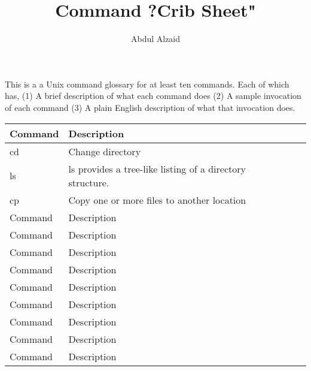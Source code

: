\documentclass[12pt, oneside]{article}   	%
\title{Command ?Crib Sheet"}
\author{Abdul Alzaid}
\begin{document}
\maketitle
This is a a Unix command glossary for at least ten commands. Each of which has, (1) A brief description of what each command does (2) A sample invocation of each command (3) A plain English description of what that invocation does.


\begin{center}
    \begin{tabular}{| l | l | l | l |}
    \hline
    Command & Description  \\ \hline
    cd & Change directory  \\ \hline
    ls &  ls provides a tree-like listing of a directory structure.  \\ \hline
    cp & Copy one or more files to another location  \\ \hline
    Command & Description  \\ \hline
    Command & Description  \\ \hline
    Command & Description  \\ \hline
    Command & Description  \\ \hline
    Command & Description  \\ \hline
    Command & Description  \\ \hline
    Command & Description  \\ \hline
    Command & Description  \\ \hline
    Command & Description  \\ \hline
        \end{tabular}
\end{center}
\end{document}

